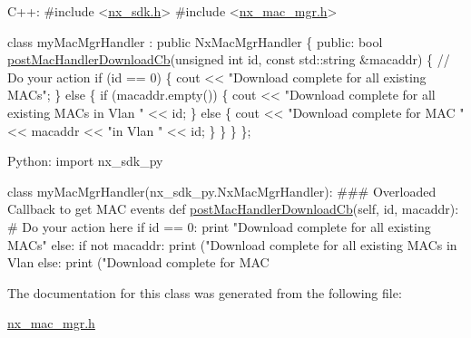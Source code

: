 \begin{DoxyCode}
C++:
\textcolor{preprocessor}{   #include <\mbox{\hyperlink{nx__sdk_8h}{nx\_sdk.h}}>}
\textcolor{preprocessor}{   #include <\mbox{\hyperlink{nx__mac__mgr_8h}{nx\_mac\_mgr.h}}>}

   \textcolor{keyword}{class }myMacMgrHandler : \textcolor{keyword}{public} NxMacMgrHandler \{
      \textcolor{keyword}{public}:
         \textcolor{keywordtype}{bool} \mbox{\hyperlink{classnxos_1_1_nx_mac_mgr_handler_a42d84c9f4da1211024912efd4416827e}{postMacHandlerDownloadCb}}(\textcolor{keywordtype}{unsigned} \textcolor{keywordtype}{int} \textcolor{keywordtype}{id}, 
                                       \textcolor{keyword}{const} std::string &macaddr) \{
              \textcolor{comment}{// Do your action}
              \textcolor{keywordflow}{if} (\textcolor{keywordtype}{id} == 0) \{
                  cout << \textcolor{stringliteral}{"Download complete for all existing MACs"};
              \} \textcolor{keywordflow}{else} \{
                  \textcolor{keywordflow}{if} (macaddr.empty()) \{
                      cout << \textcolor{stringliteral}{"Download complete for all existing MACs in Vlan "} << id;
                  \} \textcolor{keywordflow}{else} \{
                       cout << \textcolor{stringliteral}{"Download complete for MAC "} << macaddr << \textcolor{stringliteral}{"in Vlan "} << id;
                  \}
              \}
         \}
   \};

Python:
   \textcolor{keyword}{import} nx\_sdk\_py

   \textcolor{keyword}{class }myMacMgrHandler(nx\_sdk\_py.NxMacMgrHandler):
\textcolor{preprocessor}{   ### Overloaded Callback to get MAC events}
         def \mbox{\hyperlink{classnxos_1_1_nx_mac_mgr_handler_a42d84c9f4da1211024912efd4416827e}{postMacHandlerDownloadCb}}(self, id, macaddr):
\textcolor{preprocessor}{             # Do your action here}
             if id == 0:
                print "Download complete for all existing MACs"
             else:
                if not macaddr:
                   print ("Download complete for all existing MACs in Vlan %
                else:
                   print ("Download complete for MAC %
\end{DoxyCode}
 

The documentation for this class was generated from the following file\+:\begin{DoxyCompactItemize}
\item 
\mbox{\hyperlink{nx__mac__mgr_8h}{nx\+\_\+mac\+\_\+mgr.\+h}}\end{DoxyCompactItemize}
